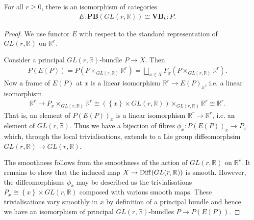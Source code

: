 \documentclass{article}
\begin{document}
\begin{theorem}
  For all $r\geq 0$, there is an isomorphism of categories
  \begin{align*}
    E : \textbf{PB}(GL(r,\mathbb{R})) \cong \textbf{VB}_k : P.
  \end{align*}
  \begin{proof}
    We use functor $E$ with respect to the standard representation
    of $GL(r,\mathbb{R})$ on $\mathbb{R}^r$.

    Consider a principal $GL(r,\mathbb{R})$-bundle $P\to X$. Then
    \begin{align*}
      P(E(P)) = P\left({P\times_{GL(r,\mathbb{R})}\mathbb{R}^r}\right)
      = \bigsqcup_{x\in X} F_x \left({P\times_{GL(r,\mathbb{R})}\mathbb{R}^r}\right).
    \end{align*}
    Now a frame of $E(P)$ at $x$ is a linear isomorphism
    $\mathbb{R}^r \to E(P)_x$, i.e. a linear isomorphism
    \begin{align}\label{eq:frame_linear_iso}
      \mathbb{R}^r\to P_x\times_{GL(r,\mathbb{R})}\mathbb{R}^r
      \cong \left(\left\lbrace{x}\right\rbrace\times GL(r,\mathbb{R})\right)\times_{GL(r,\mathbb{R})}\mathbb{R}^r \cong \mathbb{R}^r.
    \end{align}
    That is, an element of $P(E(P))_x$ is a linear isomorphism
    $\mathbb{R}^r\to\mathbb{R}^r$, i.e. an element of $GL(r,\mathbb{R})$.
    Thus we have a bijection of fibres $\phi_x : P(E(P))_x \to P_x$ which,
    through the local trivialisations, extends to a Lie group diffeomorphsim
    $GL(r,\mathbb{R})\to GL(r,\mathbb{R})$.

    The smoothness follows from the smoothness of the action
    of $GL(r,\mathbb{R})$ on $\mathbb{R}^r$. It remains to show that
    the induced map $X\to\operatorname{Diff}(GL(r,\mathbb{R}))$ is smooth.
    However, the diffeomorphisms $\phi_x$ may be described as
    the trivialisations $P_x\cong\left\lbrace{x}\right\rbrace\times
    GL(r,\mathbb{R})$ composed with various smooth maps. These trivialisations
    vary smoothly in $x$ by definition of a principal bundle and
    hence we have an isomorphism of principal $GL(r,\mathbb{R})$-bundles
    $P\to P(E(P))$.


\end{proof}
\end{theorem}
\end{document}
